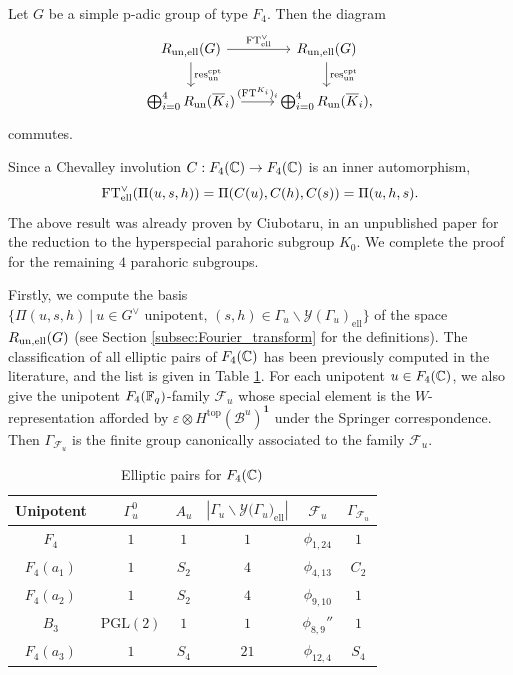\begin{theorem}\label{thm:F4}
    Let $G$ be a simple p-adic group of type $F_4$. Then the diagram 
    \[
        \begin{tikzcd}
            R_{\un,\mathrm{ell}}(G) \arrow[r, "\FT^\vee_{\mathrm{ell}}"] \arrow[d, "\res_{\un}^{\mathrm{cpt}}"] & R_{\un,\mathrm{ell}}(G) \arrow[d, "\res_{\un}^{\mathrm{cpt}}"] \\
            \bigoplus_{i=0}^4 R_{\un}(\overline{K}_i) \arrow[r, "(\FT^{K_i})_i"] & \bigoplus_{i=0}^4 R_{\un}(\overline{K}_i),
        \end{tikzcd}
    \]
    commutes.
\end{theorem}

Since a Chevalley involution $C:F_4(\mathbb{C})\to F_4(\mathbb{C})$ is an inner automorphism, 
$$\mathrm{FT}^\vee_{\mathrm{ell}}(\Pi(u,s,h))=\Pi(C(u),C(h),C(s))=\Pi(u,h,s).$$
The above result was already proven by Ciubotaru, in an unpublished paper \cite{Ciubotaru2020} for the reduction to the hyperspecial parahoric subgroup $K_0$. We complete the proof for the remaining $4$ parahoric subgroups.

Firstly, we compute the basis $\{\Pi(u,s,h)\ |\ u\in G^\vee\text{ unipotent, } (s,h)\in\Gamma_u\backslash\mathcal{Y}(\Gamma_u)_{\mathrm{ell}}\}$ of the space $R_{\mathrm{un},\text{ell}}(G)$ (see Section \ref{subsec:Fourier_transform} for the definitions). The classification of all elliptic pairs of $F_4(\mathbb{C})$ has been previously computed in the literature, and the list is given in Table \ref{tbl:F4_pairs}. For each unipotent $u\in F_4(\mathbb{C})$, we also give the unipotent $F_4(\mathbb{F}_q)$-family $\mathcal{F}_u$ whose special element is the $W$-representation afforded by $\varepsilon\otimes H^{\mathrm{top}}(\mathcal{B}^u)^{\mathbf{1}}$ under the Springer correspondence. Then $\Gamma_{\mathcal{F}_u}$ is the finite group canonically associated to the family $\mathcal{F}_u$.

\begin{table}[ht]
    \centering
    \begin{tabular}{|c|c|c|c|c|c|}
        \hline
        Unipotent & $\Gamma_u^0$ & $A_u$ & $|\Gamma_u\backslash\mathcal{Y}\mathcal(\Gamma_u)_{\text{ell}}|$ & $\mathcal{F}_{u}$ & $\Gamma_{\mathcal{F}_u}$ \\\hline
        $F_4$ & $1$ & $1$ & $1$ & $\phi_{1,24}$ & $1$ \\\hline
        $F_4(a_1)$ & $1$ & $S_2$ & $4$ & $\phi_{4,13}$ & $C_2$ \\\hline
        $F_4(a_2)$ & $1$ & $S_2$ & $4$ & $\phi_{9,10}$ & $1$ \\\hline
        $B_3$ & $\text{PGL}(2)$ & $1$ & $1$ & $\phi_{8,9}''$ & $1$ \\\hline
        $F_4(a_3)$ & $1$ & $S_4$ & $21$ & $\phi_{12,4}$ & $S_4$\\\hline
    \end{tabular}
    \caption{Elliptic pairs for $F_4(\mathbb{C})$}
    \label{tbl:F4_pairs}
\end{table}

